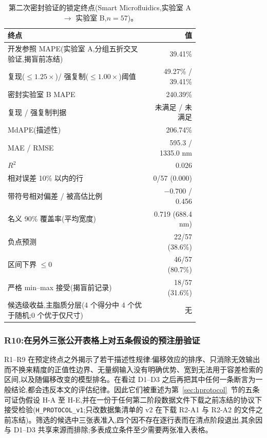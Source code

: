\documentclass[11pt,a4paper]{ctexart}
\begin{document}
\begin{table}[t]
\centering\small
\caption{第二次密封验证的锁定终点(Smart Microfluidics,实验室 A $\to$ 实验室 B,$n=57$)。}
\label{tab:d3}
\begin{tabular}{p{0.74\linewidth}r}
\toprule
终点 & 值 \\
\midrule
开发参照 MAPE(实验室 A,分组五折交叉验证,揭盲前冻结) & 39.41\% \\
复现($\le 1.25\times$)/ 强复制($\le 1.00\times$)阈值 & 49.27\% / 39.41\% \\
密封实验室 B MAPE & 240.39\% \\
复现 / 强复制判据 & 未满足 / 未满足 \\
MdAPE(描述性) & 206.74\% \\
MAE / RMSE & 595.3 / 1335.0 nm \\
$R^2$ & 0.026 \\
相对误差 10\% 以内的行 & 0/57 (0.000) \\
带符号相对偏差 / 被高估比例 & $-0.700$ / 0.456 \\
名义 90\% 覆盖率(平均宽度) & 0.719 (688.4 nm) \\
负点预测 & 22/57 (38.6\%) \\
区间下界 $\le 0$ & 46/57 (80.7\%) \\
严格 min–max 接受(揭盲前记录) & 18/57 (31.6\%) \\
候选级收益,主脂质分层(4 个得分中 4 个优于随机;0 个优于仅尺寸) & 无 \\
\bottomrule
\end{tabular}
\end{table}


\subsubsection{R10:在另外三张公开表格上对五条假设的预注册验证}
\label{sec:r10}

R1--R9 在预定终点之外揭示了若干描述性规律:偏移效应的排序、只消除无效输出而不换来精度的正值性边界、无量纲输入没有明确优势、宽到无法用于容差检索的区间,以及随偏移改变的模型排名。在看过 D1--D3 之后再把其中任何一条断言为一般结论,都会违反本文的评估纪律。因此它们被重述为第~\ref{sec:hprotocol}~节的五条可证伪假设 H-A 至 H-E,并在一份于任何第二阶段数据文件下载之前冻结的协议下接受检验(\texttt{H\_PROTOCOL\_v1};只改数据集清单的 v2 在下载 R2-A1 与 R2-A2 的文件之前冻结)。筛选的候选中三张表准入,四个因不存在逐行表而在清点阶段退出,其余因与 D1--D3 共享来源而排除;多表成立条件至少需要两张准入表格。
\end{document}
